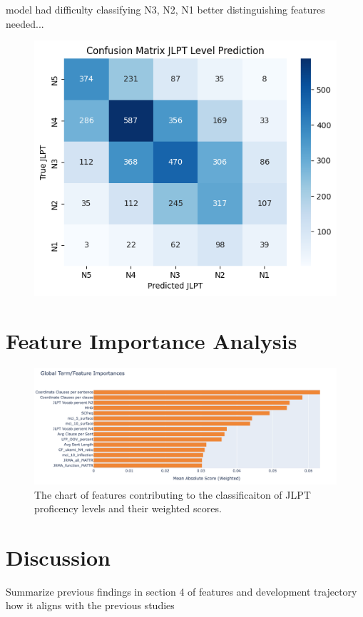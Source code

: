 model had difficulty classifying N3, N2, N1 better distinguishing features needed...

\begin{figure}[h!]
           \centering
           \includegraphics[scale=.4]{img/confusionMatrix}
           \caption[Confusion Matrix]{}
           \label{fig:conMA}
\end{figure}


\section{Feature Importance Analysis}
\begin{figure}[h!]
    \centering
    \includegraphics[scale=.4]{img/feature_importance}
    \caption{The chart of features contributing to the classificaiton of JLPT proficency levels and their weighted scores.}
    \label{fig:featureimportance}
\end{figure}


\section{Discussion}
Summarize previous findings in section 4 of features and development trajectory how it aligns with the previous studies


